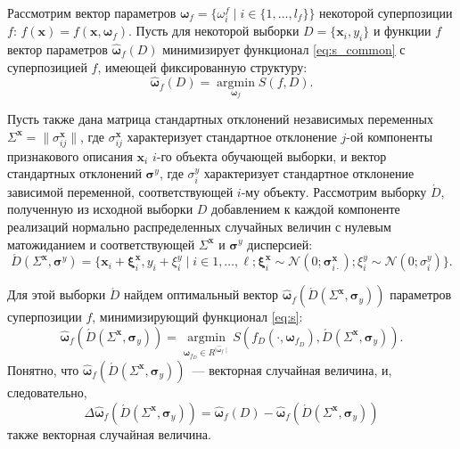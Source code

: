 \documentclass[11pt,a4paper]{article}
\theoremstyle{definition}
\begin{document}
Рассмотрим вектор параметров
$\boldsymbol{\omega}_f = \{ \omega_i^f \mid i \in \{ 1, \dots, l_f \} \}$
некоторой суперпозиции $f$: $f(\mathbf{x}) = f(\mathbf{x}, \boldsymbol{\omega}_f)$.
Пусть для некоторой выборки $D = \{ \mathbf{x}_i, y_i \}$ и функции
$f$ вектор параметров $\hat{\boldsymbol{\omega}}_f(D)$ минимизирует
функционал \eqref{eq:s_common} с суперпозицией $f$, имеющей фиксированную
структуру:
\[
  \hat{\boldsymbol{\omega}}_f(D) = \mathop{\arg \min}\limits_{\boldsymbol{\omega}_f} S(f, D).
\]

Пусть также дана матрица стандартных отклонений
независимых переменных $\Sigma^{\mathbf{x}} = \| \sigma^{\mathbf{x}}_{ij} \|$,
где $\sigma^{\mathbf{x}}_{ij}$ характеризует стандартное отклонение $j$-ой
компоненты признакового описания $\mathbf{x}_i$ $i$-го объекта обучающей выборки,
и вектор стандартных отклонений $\boldsymbol{\sigma}^y$, где $\sigma^y_i$
характеризует стандартное отклонение зависимой переменной, соответствующей
$i$-му объекту.
Рассмотрим выборку $\acute{D}$, полученную из исходной выборки $D$
добавлением к каждой компоненте реализаций нормально распределенных
случайных величин с нулевым матожиданием и соответствующей
$\Sigma^{\mathbf{x}}$ и $\boldsymbol{\sigma}^y$ дисперсией:
\begin{equation}
  \acute{D}(\Sigma^{\mathbf{x}}, \boldsymbol{\sigma}^y) = \{ \mathbf{x}_i + \boldsymbol{\xi}^{\mathbf{x}}_i, y_i + \xi^y_i \mid i \in 1, \dots, \ell; \boldsymbol{\xi}^{\mathbf{x}}_i \sim \mathcal{N}(0; \boldsymbol{\sigma}^{\mathbf{x}}_{i \cdot}); \xi^y_i \sim \mathcal{N}(0; \sigma^y_i) \}.
  \label{eq:d_acute}
\end{equation}

Для этой выборки $\acute{D}$ найдем оптимальный вектор $\hat{\boldsymbol{\omega}}_f (\acute{D} (\Sigma^{\mathbf{x}}, \boldsymbol{\sigma}_y))$
параметров суперпозиции $f$, минимизирующий функционал \eqref{eq:s}:
\begin{equation}
  \hat{\boldsymbol{\omega}}_f (\acute{D} (\Sigma^{\mathbf{x}}, \boldsymbol{\sigma}_y)) = \mathop{\arg \min}\limits_{\boldsymbol{\omega}_{f_D} \in R^{\mid \hat{\boldsymbol{\omega}}_f \mid}} S (f_D (\cdot, \boldsymbol{\omega}_{f_D}), \acute{D} (\Sigma^{\mathbf{x}}, \boldsymbol{\sigma}_y)).
  \label{eq:hat_omega}
\end{equation}
Понятно, что $\hat{\boldsymbol{\omega}}_f (\acute{D} (\Sigma^{\mathbf{x}}, \boldsymbol{\sigma}_y))$~---
векторная случайная величина, и, следовательно,
\[
  \Delta\hat{\boldsymbol{\omega}}_f(\acute{D} (\Sigma^{\mathbf{x}}, \boldsymbol{\sigma}_y) ) = \hat{\boldsymbol{\omega}}_f(D) - \hat{\boldsymbol{\omega}}_f (\acute{D} (\Sigma^{\mathbf{x}}, \boldsymbol{\sigma}_y))
\]
также векторная случайная величина.
\end{document}
